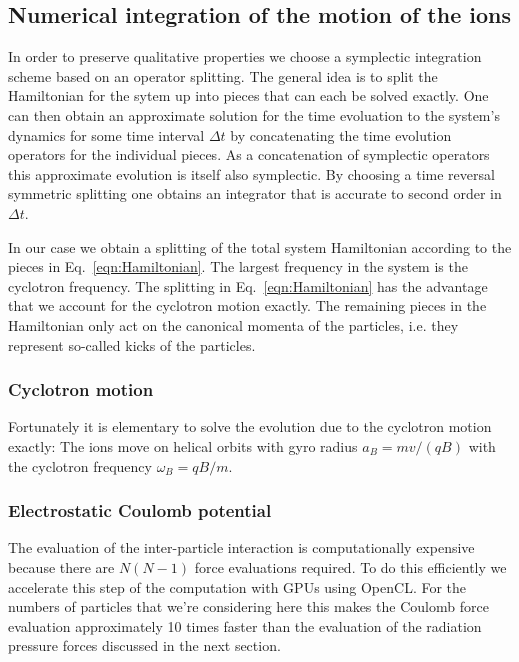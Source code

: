 \documentclass[
  aps,
  reprint,
  twoside,
  showpacs,
  amsmath,
  amssymb,
  floatfix
]{revtex4-1}
\begin{document}
\subsection{Numerical integration of the motion of the ions}
\label{ssec:NumericalIntegration}

In order to preserve qualitative properties we choose a symplectic
integration scheme based on an operator splitting.  The general idea is
to split the Hamiltonian for the sytem up into pieces that can each be
solved exactly.  One can then obtain an approximate solution for the
time evoluation to the system's dynamics for some time interval $\Delta
t$ by concatenating the time evolution operators for the individual
pieces.  As a concatenation of symplectic operators this approximate
evolution is itself also symplectic.  By choosing a time reversal
symmetric splitting one obtains an integrator that is accurate to second
order in $\Delta t$.  

In our case we obtain a splitting of the total system Hamiltonian
according to the pieces in Eq.~\ref{eqn:Hamiltonian}.  The largest
frequency in the system is the cyclotron frequency.  The splitting in
Eq.~\ref{eqn:Hamiltonian} has the advantage that we account for the
cyclotron motion exactly.  The remaining pieces in the Hamiltonian only
act on the canonical momenta of the particles, i.e. they represent
so-called kicks of the particles.  


\subsubsection{Cyclotron motion}

Fortunately it is elementary to solve
the evolution due to the cyclotron motion exactly: The ions move on
helical orbits with gyro radius $a_B=mv/(qB)$ with the cyclotron frequency
$\omega_B = qB/m$.


\subsubsection{Electrostatic Coulomb potential}

The evaluation of the inter-particle interaction is computationally
expensive because there are $N(N-1)$ force evaluations required.  To do
this efficiently we accelerate this step of the computation with GPUs
using OpenCL.  For the numbers of particles that we're considering here
this makes the Coulomb force evaluation approximately 10 times faster
than the evaluation of the radiation pressure forces discussed in the
next section. 
\end{document}
